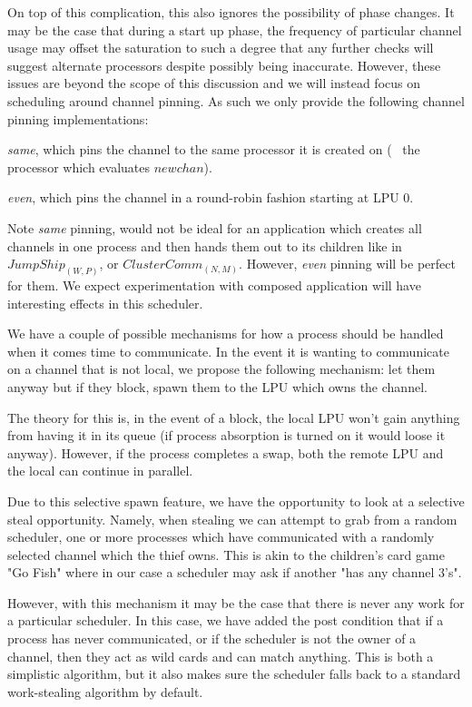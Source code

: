On top of this complication, this also ignores the possibility of phase changes.
It may be the case that during a start up phase, the frequency of particular 
channel usage may offset the saturation to such a degree that any further 
checks will suggest alternate processors despite possibly being inaccurate.
However, these issues are beyond the scope of this discussion and we will 
instead focus on scheduling around channel pinning. As such we only provide the
following channel pinning implementations: 
\begin{inparaenum}
\item \emph{same}, which pins the channel to the same processor it is created 
    on (\ie~ the processor which evaluates $newchan$).
\item \emph{even}, which pins the channel in a round-robin fashion starting at
    LPU $0$.
\end{inparaenum}

Note \emph{same} pinning, would not be ideal for an application which creates
all channels in one process and then hands them out to its children like in
$JumpShip_{(W,P)}$, or $ClusterComm_{(N,M)}$. However, \emph{even} pinning will
be perfect for them. We expect experimentation with composed application will
have interesting effects in this scheduler.

We have a couple of possible mechanisms for how a process should be handled when
it comes time to communicate. In the event it is wanting to communicate on a 
channel that is not local, we propose the following mechanism: let them anyway
but if they block, spawn them to the LPU which owns the channel.

The theory for this is, in the event of a block, the local LPU won't gain 
anything from having it in its queue (if process absorption is turned on it would 
loose it anyway). However, if the process completes a swap, both the remote
LPU and the local can continue in parallel.

Due to this selective spawn feature, we have the opportunity to look at a 
selective steal opportunity. Namely, when stealing we can attempt to grab from
a random scheduler, one or more processes which have communicated with a 
randomly selected channel which the thief owns. This is akin to the children's
card game "Go Fish" where in our case a scheduler may ask if another "has any
channel 3's".

However, with this mechanism it may be the case that there is never any work
for a particular scheduler. In this case, we have added the post condition that
if a process has never communicated, or if the scheduler is not the owner of a
channel, then they act as wild cards and can match anything. This is both a 
simplistic algorithm, but it also makes sure the scheduler falls back to a 
standard work-stealing algorithm by default.


